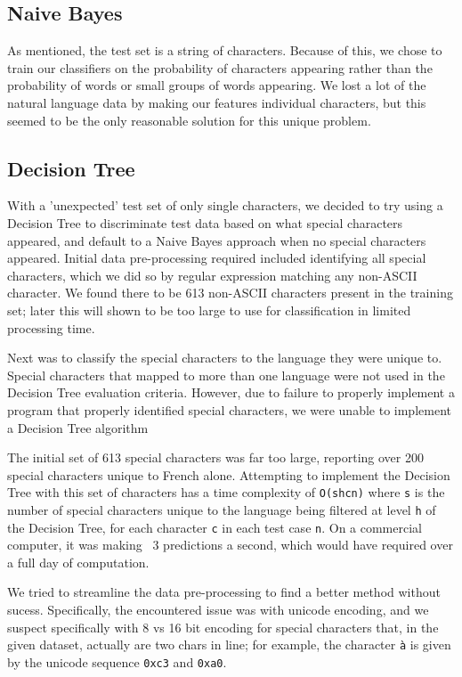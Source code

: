 \documentclass[conference]{IEEEtran}
\begin{document}
\subsection{Naive Bayes}
As mentioned, the test set is a string of characters. Because of this, we chose to train our classifiers on the probability of characters appearing rather than the probability of words or small groups of words appearing. We lost a lot of the natural language data by making our features individual characters, but this seemed to be the only reasonable solution for this unique problem. 

\subsection{Decision Tree}
With a 'unexpected' test set of only single characters, we decided to try using a Decision Tree to discriminate test data based on what special characters appeared, and default to a Naive Bayes approach when no special characters appeared. Initial data pre-processing required included identifying all special characters, which we did so by regular expression matching any non-ASCII character. We found there to be 613 non-ASCII characters present in the training set; later this will shown to be too large to use for classification in limited processing time.

Next was to classify the special characters to the language they were unique to. Special characters that mapped to more than one language were not used in the Decision Tree evaluation criteria. However, due to failure to properly implement a program that properly identified special characters, we were unable to implement a Decision Tree algorithm 

The initial set of 613 special characters was far too large, reporting over 200 special characters unique to French alone. Attempting to implement the Decision Tree with this set of characters has a time complexity of \texttt{O(shcn)} where \texttt{s} is the number of special characters unique to the language being filtered at level \texttt{h} of the Decision Tree, for each character \texttt{c} in each test case \texttt{n}. On a commercial computer, it was making ~3 predictions a second, which would have required over a full day of computation.

We tried to streamline the data pre-processing to find a better method without sucess. Specifically, the encountered issue was with unicode encoding, and we suspect specifically with 8 vs 16 bit encoding for special characters that, in the given dataset, actually are two chars in line; for example, the character \texttt{\`{a}} is given by the unicode sequence \texttt{0xc3} and \texttt{0xa0}.
\end{document}
